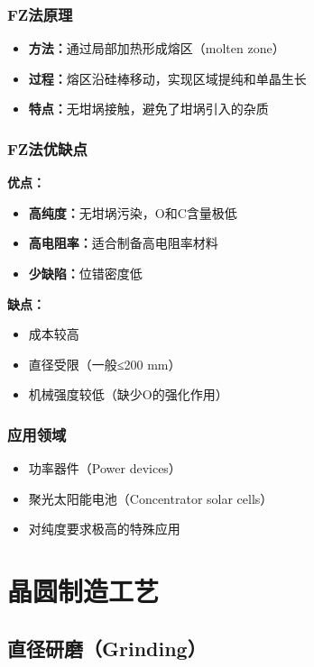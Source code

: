 \documentclass[UTF8,12pt,a4paper]{ctexart}
\begin{document}
\subsubsection{FZ法原理}

\begin{itemize}
    \item \textbf{方法：}通过局部加热形成熔区（molten zone）
    \item \textbf{过程：}熔区沿硅棒移动，实现区域提纯和单晶生长
    \item \textbf{特点：}无坩埚接触，避免了坩埚引入的杂质
\end{itemize}

\subsubsection{FZ法优缺点}

\textbf{优点：}
\begin{itemize}
    \item \textbf{高纯度：}无坩埚污染，O和C含量极低
    \item \textbf{高电阻率：}适合制备高电阻率材料
    \item \textbf{少缺陷：}位错密度低
\end{itemize}

\textbf{缺点：}
\begin{itemize}
    \item 成本较高
    \item 直径受限（一般≤200 mm）
    \item 机械强度较低（缺少O的强化作用）
\end{itemize}

\subsubsection{应用领域}

\begin{itemize}
    \item 功率器件（Power devices）
    \item 聚光太阳能电池（Concentrator solar cells）
    \item 对纯度要求极高的特殊应用
\end{itemize}

\section{晶圆制造工艺}

\subsection{直径研磨（Grinding）}
\end{document}
